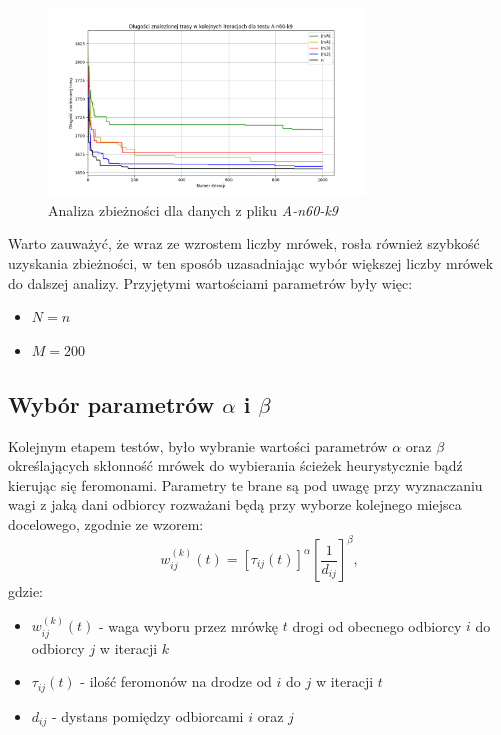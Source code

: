\documentclass[10pt]{article}
\begin{document}
\begin{figure}[H]
    \centering
    \includegraphics[width=0.75\textwidth]{iterations_60.png}
    \caption{Analiza zbieżności dla danych z pliku \textit{A-n60-k9}}
    \label{fig:iterations60}
\end{figure}

Warto zauważyć, że wraz ze wzrostem liczby mrówek, rosła również szybkość uzyskania zbieżności, w ten sposób uzasadniając wybór większej liczby mrówek do dalszej analizy. Przyjętymi wartościami parametrów były więc:
\begin{itemize}
    \item $N = n$
    \item $M = 200$  
\end{itemize}

\subsection{Wybór parametrów $\alpha$ i $\beta$}
Kolejnym etapem testów, było wybranie wartości parametrów $\alpha$ oraz $\beta$ określających skłonność mrówek do wybierania ścieżek heurystycznie bądź kierując się feromonami. Parametry te brane są pod uwagę przy wyznaczaniu wagi z jaką dani odbiorcy rozważani będą przy wyborze kolejnego miejsca docelowego, zgodnie ze wzorem:
\begin{equation*}
    w_{ij}^{(k)}(t) = \left[ \tau_{ij}(t) \right]^\alpha \left[ \frac{1}{d_{ij}}\right]^\beta
,\end{equation*} gdzie:
\begin{itemize}
    \item $w_{ij}^{(k)}(t)$ - waga wyboru przez mrówkę $t$ drogi od obecnego odbiorcy $i$ do odbiorcy $j$ w iteracji $k$
    \item $\tau_{ij}(t)$ - ilość feromonów na drodze od $i$ do $j$ w iteracji $t$
    \item $d_{ij}$ - dystans pomiędzy odbiorcami $i$ oraz $j$
\end{itemize}
\end{document}

